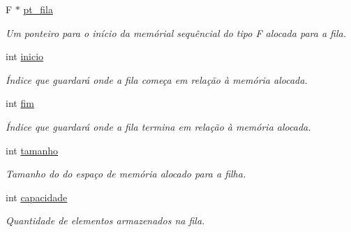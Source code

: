 \begin{DoxyCompactItemize}
\item 
\hypertarget{class_fila_a5907956bc6b1d377a9e70348ad905811}{F $\ast$ \hyperlink{class_fila_a5907956bc6b1d377a9e70348ad905811}{pt\-\_\-fila}}\label{class_fila_a5907956bc6b1d377a9e70348ad905811}

\begin{DoxyCompactList}\small\item\em Um ponteiro para o início da memórial sequêncial do tipo F alocada para a fila. \end{DoxyCompactList}\item 
\hypertarget{class_fila_a8a01a193f0007722c9b68796ee31c30a}{int \hyperlink{class_fila_a8a01a193f0007722c9b68796ee31c30a}{inicio}}\label{class_fila_a8a01a193f0007722c9b68796ee31c30a}

\begin{DoxyCompactList}\small\item\em Índice que guardará onde a fila começa em relação à memória alocada. \end{DoxyCompactList}\item 
\hypertarget{class_fila_ab4c63a5594ee43c3ff0d22c330c8afd5}{int \hyperlink{class_fila_ab4c63a5594ee43c3ff0d22c330c8afd5}{fim}}\label{class_fila_ab4c63a5594ee43c3ff0d22c330c8afd5}

\begin{DoxyCompactList}\small\item\em Índice que guardará onde a fila termina em relação à memória alocada. \end{DoxyCompactList}\item 
\hypertarget{class_fila_ad92255694596a067e7a9672f5c4a1eb5}{int \hyperlink{class_fila_ad92255694596a067e7a9672f5c4a1eb5}{tamanho}}\label{class_fila_ad92255694596a067e7a9672f5c4a1eb5}

\begin{DoxyCompactList}\small\item\em Tamanho do do espaço de memória alocado para a filha. \end{DoxyCompactList}\item 
\hypertarget{class_fila_aa86f96abdd35390e3eaf3b80cc940edb}{int \hyperlink{class_fila_aa86f96abdd35390e3eaf3b80cc940edb}{capacidade}}\label{class_fila_aa86f96abdd35390e3eaf3b80cc940edb}

\begin{DoxyCompactList}\small\item\em Quantidade de elementos armazenados na fila. \end{DoxyCompactList}\end{DoxyCompactItemize}
